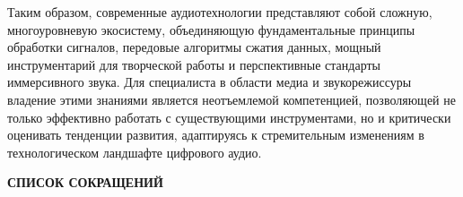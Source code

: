 \documentclass{SibFU-docs}
\begin{document}
Таким образом, современные аудиотехнологии представляют собой сложную, многоуровневую экосистему, объединяющую фундаментальные принципы обработки сигналов, передовые алгоритмы сжатия данных, мощный инструментарий для творческой работы и перспективные стандарты иммерсивного звука. Для специалиста в области медиа и звукорежиссуры владение этими знаниями является неотъемлемой компетенцией, позволяющей не только эффективно работать с существующими инструментами, но и критически оценивать тенденции развития, адаптируясь к стремительным изменениям в технологическом ландшафте цифрового аудио.

\newpage
\begin{center}\textbf{СПИСОК СОКРАЩЕНИЙ}\end{center}
{}

\vspace{1em}
\end{document}

